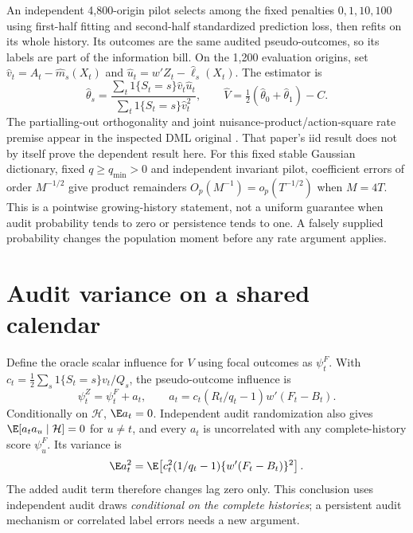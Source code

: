 An independent 4,800-origin pilot selects among the fixed penalties
$0,1,10,100$ using first-half fitting and second-half standardized prediction
loss, then refits on its whole history. Its outcomes are the same audited
pseudo-outcomes, so its labels are part of the information bill. On the
1,200 evaluation origins, set $\widehat v_t=A_t-\widehat m_s(X_t)$ and
$\widehat u_t=w'Z_t-\widehat\ell_s(X_t)$. The estimator is
\begin{equation}
 \widehat\theta_s=
 \frac{\sum_t1\{S_t=s\}\widehat v_t\widehat u_t}
      {\sum_t1\{S_t=s\}\widehat v_t^2},\qquad
 \widehat V=\tfrac12(\widehat\theta_0+\widehat\theta_1)-C.
 \label{integrated:linked_funding:eq:estimate}
\end{equation}
The partialling-out orthogonality and joint nuisance-product/action-square
rate premise appear in the inspected DML original \cite{dml2018}.
That paper's iid result does not by itself prove the dependent result here.
For this fixed stable Gaussian dictionary, fixed $q\ge q_{\min}>0$ and
independent invariant pilot, coefficient errors of order $M^{-1/2}$ give
product remainders $O_p(M^{-1})=o_p(T^{-1/2})$ when $M=4T$. This is a
pointwise growing-history statement, not a uniform guarantee when audit
probability tends to zero or persistence tends to one. A falsely supplied
probability changes the population moment before any rate argument applies.

\section{Audit variance on a shared calendar}

Define the oracle scalar influence for $V$ using focal outcomes as $\psi_t^F$.
With $c_t=\tfrac12\sum_s1\{S_t=s\}v_t/Q_s$, the pseudo-outcome influence is
\begin{equation}
 \psi_t^Z=\psi_t^F+a_t,
 \qquad a_t=c_t(R_t/q_t-1)w'(F_t-B_t).\label{integrated:linked_funding:eq:decompose}
\end{equation}
Conditionally on $\mathcal H$, $\E a_t=0$. Independent audit randomization
also gives $\E[a_ta_u\mid\mathcal H]=0$ for $u\ne t$, and every $a_t$ is
uncorrelated with any complete-history score $\psi_u^F$. Its variance is
\begin{equation}
 \E a_t^2=\E\!\left[c_t^2(1/q_t-1)\{w'(F_t-B_t)\}^2\right].
 \label{integrated:linked_funding:eq:auditvar}
\end{equation}
The added audit term therefore changes lag zero only. This conclusion uses
independent audit draws \emph{conditional on the complete histories}; a
persistent audit mechanism or correlated label errors needs a new argument.


